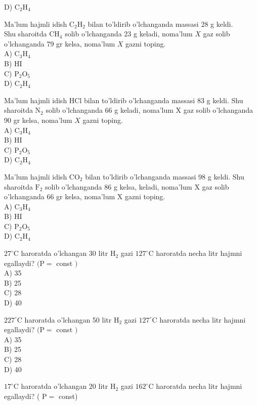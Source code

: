 D) $\mathrm{C}_{2} \mathrm{H}_{4}$
  \item Ma'lum hajmli idish $\mathrm{C}_{2} \mathrm{H}_{2}$ bilan to'ldirib o'lchanganda massasi 28 g keldi.\\
Shu sharoitda $\mathrm{CH}_{4}$ solib o'lchanganda 23 g keladi, noma'lum $X$ gaz solib o'lchanganda 79 gr kelsa, noma'lum $X$ gazni toping.\\
A) $\mathrm{C}_{3} \mathrm{H}_{4}$\\
B) HI\\
C) $\mathrm{P}_{2} \mathrm{O}_{5}$\\
D) $\mathrm{C}_{2} \mathrm{H}_{4}$
  \item Ma’lum hajmli idish HCl bilan to'ldirib o'lchanganda massasi 83 g keldi. Shu sharoitda $\mathrm{N}_{2}$ solib o'lchanganda 66 g keladi, noma'lum X gaz solib o'lchanganda 90 gr kelsa, noma'lum $X$ gazni toping.\\
A) $\mathrm{C}_{3} \mathrm{H}_{4}$\\
B) HI\\
C) $\mathrm{P}_{2} \mathrm{O}_{5}$\\
D) $\mathrm{C}_{2} \mathrm{H}_{4}$
  \item Ma'lum hajmli idish $\mathrm{CO}_{2}$ bilan to'ldirib o'lchanganda massasi 98 g keldi. Shu sharoitda $\mathrm{F}_{2}$ solib o'lchanganda 86 g kelsa, keladi, noma'lum X gaz solib o'lchanganda 66 gr kelsa, noma'lum X gazni toping.\\
A) $\mathrm{C}_{3} \mathrm{H}_{4}$\\
B) HI\\
C) $\mathrm{P}_{2} \mathrm{O}_{5}$\\
D) $\mathrm{C}_{2} \mathrm{H}_{4}$
  \item $27^{\circ} \mathrm{C}$ haroratda o'lchangan 30 litr $\mathrm{H}_{2}$ gazi $127^{\circ} \mathrm{C}$ haroratda necha litr hajmni egallaydi? $(\mathrm{P}=$ const $)$\\
A) 35\\
B) 25\\
C) 28\\
D) 40\\
  \item $227^{\circ} \mathrm{C}$ haroratda o'lchangan 50 litr $\mathrm{H}_{2}$ gazi $127^{\circ} \mathrm{C}$ haroratda necha litr hajmni egallaydi? $(\mathrm{P}=$ const $)$\\
A) 35\\
B) 25\\
C) 28\\
D) 40
  \item $17^{\circ} \mathrm{C}$ haroratda o'lchangan 20 litr $\mathrm{H}_{2}$ gazi $162^{\circ} \mathrm{C}$ haroratda necha litr hajmni egallaydi? ( $\mathrm{P}=$ const)\\
